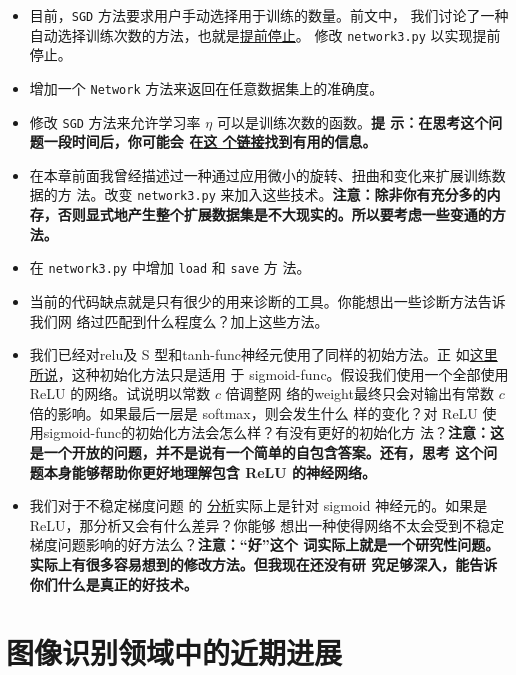 \begin{itemize}
\item 目前，\lstinline!SGD! 方法要求用户手动选择用于训练\epochs{}的数量。前文中，
  我们讨论了一种自动选择训练次数的方法，也就是\hyperref[early_stopping]{提前停止}。
  修改 \lstinline!network3.py! 以实现提前停止。
\item 增加一个 \lstinline!Network! 方法来返回在任意数据集上的准确度。
\item 修改 \lstinline!SGD! 方法来允许学习率 $\eta$ 可以是训练次数的函数。\textbf{提
    示：在思考这个问题一段时间后，你可能会
    在\href{https://groups.google.com/forum/\#!topic/theano-users/NQ9NYLvleGc}{这
      个链接}找到有用的信息。}
\item 在本章前面我曾经描述过一种通过应用微小的旋转、扭曲和变化来扩展训练数据的方
  法。改变 \lstinline!network3.py! 来加入这些技术。\textbf{注意：除非你有充分多的内
    存，否则显式地产生整个扩展数据集是不大现实的。所以要考虑一些变通的方法。}
\item 在 \lstinline!network3.py! 中增加 \lstinline!load! 和 \lstinline!save! 方
  法。
\item 当前的代码缺点就是只有很少的用来诊断的工具。你能想出一些诊断方法告诉我们网
  络过匹配到什么程度么？加上这些方法。
\item 我们已经对\gls*{relu}及 S 型和\gls*{tanh-func}神经元使用了同样的初始方法。正
  如\hyperref[sec:weight_initialization]{这里所说}，这种初始化方法只是适用
  于 \gls*{sigmoid-func}。假设我们使用一个全部使用 ReLU 的网络。试说明以常数 $c$ 倍调整网
  络的\gls*{weight}最终只会对输出有常数 $c$ 倍的影响。如果最后一层是 softmax，则会发生什么
  样的变化？对 ReLU 使用\gls*{sigmoid-func}的初始化方法会怎么样？有没有更好的初始化方
  法？\textbf{注意：这是一个开放的问题，并不是说有一个简单的自包含答案。还有，思考
    这个问题本身能够帮助你更好地理解包含 ReLU 的神经网络。}
\item 我们对于不稳定梯度问题
  的%
  \hyperref[sec:what_is_causing_the_vanishing_gradient_problem_unstable_gradients_in_deep_neural_nets]{%
    分析}实际上是针对 sigmoid 神经元的。如果是 ReLU，那分析又会有什么差异？你能够
  想出一种使得网络不太会受到不稳定梯度问题影响的好方法么？\textbf{注意：“好”这个
    词实际上就是一个研究性问题。实际上有很多容易想到的修改方法。但我现在还没有研
    究足够深入，能告诉你们什么是真正的好技术。}
\end{itemize}

\section{图像识别领域中的近期进展}
\label{sec:recent_progress_in_image_recognition}

